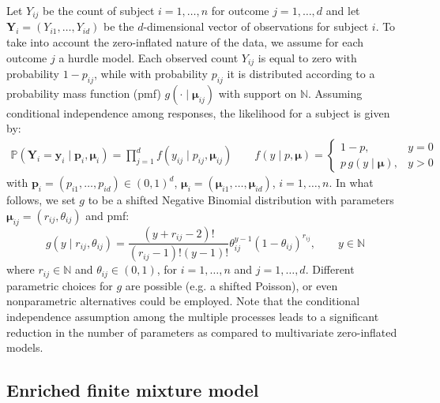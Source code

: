 \documentclass[11pt]{article}
\begin{document}
Let $Y_{ij}$ be the count of subject $i = 1, \dots, n$ for outcome $j = 1, \dots, d$ and let $\bm Y_i =(Y_{i1},\ldots, Y_{id})$ be the $d$-dimensional vector of observations for subject $i$. To take into account the zero-inflated nature of the data, we assume for each outcome $j$ a hurdle model. Each observed count $Y_{ij}$ is equal to zero with probability $1 - p_{ij}$, while with probability $p_{ij}$ it is distributed according to a probability mass function (pmf) $g\left(\cdot\mid \bm \mu_{ij}\right)$ with support on $\mathbb{N}$. Assuming conditional independence among responses, the likelihood for a subject is given by:
\begin{equation}\label{eq:kernel}
	\begin{aligned}
		\mathbb{P}\left( \bm Y_i = \bm y_i \mid \bm{p}_i, \bm{\mu}_i \right) = \prod\limits_{j=1}^d
		f\left(y_{ij}\mid p_{ij},\bm \mu_{ij}\right)
		\qquad
		f\left(y\mid p,\bm{\mu}\right) = \begin{cases}
			1 - p, &y = 0\\
			p\, g\left(y\mid \bm{\mu}\right), &y>0
		\end{cases}
	\end{aligned}
\end{equation}
with $\bm p_i = \left(p_{i1}, \ldots, p_{id}\right) \in (0,1)^{d}$, $\bm \mu_i = \left(\bm \mu_{i1},\ldots,\bm \mu_{id}\right)$, $i = 1, \dots, n$. In what follows, we set $g$ to be a shifted Negative Binomial distribution with parameters $\bm \mu_{ij} =(r_{ij}, \theta_{ij})$ and pmf: 
\begin{equation}\label{eq:nonzeropart}
	g\left(y \mid r_{ij}, \theta_{ij} \right) = \frac{\left(y + r_{ij} - 2\right)!}{\left(r_{ij} - 1\right)!\left(y - 1\right)!} \theta_{ij} ^{y - 1} \left(1 - \theta_{ij}\right)^{r_{ij}}, \qquad y \in \mathbb{N}
\end{equation}
where $r_{ij} \in \mathbb{N}$ and $\theta_{ij} \in (0,1)$, for $i = 1, \dots, n$ and $j = 1, \dots, d$. Different parametric choices for $g$ are possible (e.g. a shifted Poisson), or even nonparametric alternatives could be employed. Note that the conditional independence assumption among the multiple processes leads to a significant reduction in the number of parameters as compared to multivariate zero-inflated models.


\subsection{Enriched finite mixture model}
\end{document}
